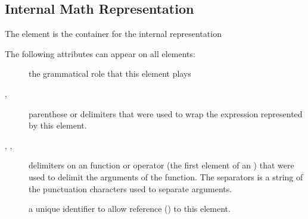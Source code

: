 \documentclass{report}
\begin{document}
\subsection{Internal Math Representation}\label{math.details.representation}
The  element is the container for the internal representation

The following attributes can appear on all  elements:
\begin{description}
\item[] the grammatical role that this element plays 
\item[, ] parenthese or delimiters that were used to wrap the
   expression represented by this element.
\item[, , ] delimiters on an function or operator
   (the first element of an )  that were used to delimit the arguments of the function.
    The separators is a string of the punctuation characters used to separate arguments.
\item[] a unique identifier to allow reference () to this element.
\end{description}
\end{document}
